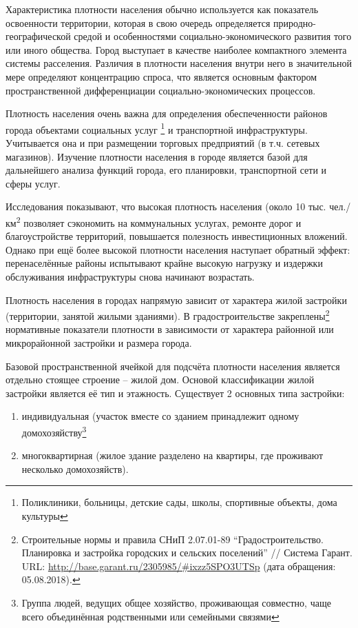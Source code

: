 \documentclass[
  11pt,
  russian,
]{book}
\begin{document}
Характеристика плотности населения обычно используется как показатель освоенности территории, которая в свою очередь определяется природно-географической средой и особенностями социально-экономического развития того или иного общества. Город выступает в качестве наиболее компактного элемента системы расселения. Различия в плотности населения внутри него в значительной мере определяют концентрацию спроса, что является основным фактором пространственной дифференциации социально-экономических процессов.

Плотность населения очень важна для определения обеспеченности районов города объектами социальных услуг \footnote{Поликлиники, больницы, детские сады, школы, спортивные объекты, дома культуры} и транспортной инфраструктуры. Учитывается она и при размещении торговых предприятий (в т.ч. сетевых магазинов). Изучение плотности населения в городе является базой для дальнейшего анализа функций города, его планировки, транспортной сети и сферы услуг.

Исследования показывают, что высокая плотность населения (около 10 тыс. чел./км\textsuperscript{2} позволяет сэкономить на коммунальных услугах, ремонте дорог и благоустройстве территорий, повышается полезность инвестиционных вложений. Однако при ещё более высокой плотности населения наступает обратный эффект: перенаселённые районы испытывают крайне высокую нагрузку и издержки обслуживания инфраструктуры снова начинают возрастать.

Плотность населения в городах напрямую зависит от характера жилой застройки (территории, занятой жилыми зданиями). В градостроительстве закреплены\footnote{Строительные нормы и правила СНиП 2.07.01-89 ``Градостроительство. Планировка и застройка городских и сельских поселений'' // Система Гарант. URL: \url{http://base.garant.ru/2305985/\#ixzz5SPO3UTSp} (дата обращения: 05.08.2018).} нормативные показатели плотности в зависимости от характера районной или микрорайонной застройки и размера города.

Базовой пространственной ячейкой для подсчёта плотности населения является отдельно стоящее строение -- жилой дом. Основой классификации жилой застройки является её тип и этажность. Существует 2 основных типа застройки:

\begin{enumerate}
\def\labelenumi{\arabic{enumi}.}
\item
  индивидуальная (участок вместе со зданием принадлежит одному домохозяйству\footnote{Группа людей, ведущих общее хозяйство, проживающая совместно, чаще всего объединённая родственными или семейными связями}
\item
  многоквартирная (жилое здание разделено на квартиры, где проживают несколько домохозяйств).
\end{enumerate}
\end{document}
